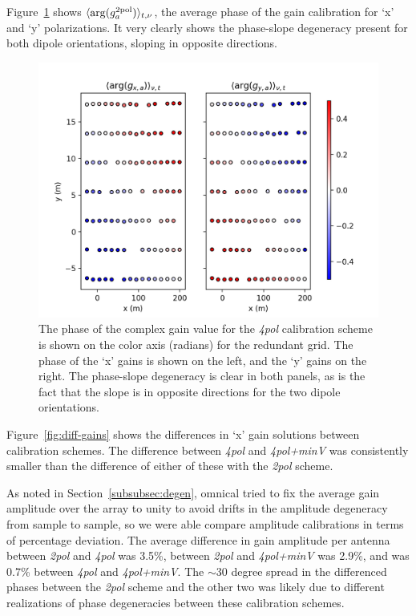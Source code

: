 Figure~\ref{fig:4pol-geo-angle} shows $\langle {\rm arg}( g^{\rm 2pol}_{a} ) \rangle_{t,\nu}$, the average phase of the gain calibration for `x' and `y' polarizations. It very clearly shows the phase-slope degeneracy present for both dipole orientations, sloping in opposite directions. 

\begin{figure}
\centering
\includegraphics[scale=0.5]{chapters/polcal/figures/4pol_geo.png}
\caption[The phase of the complex gain value for the \textit{4pol} calibration scheme.]{The phase of the complex gain value for the \textit{4pol} calibration scheme is shown on the color axis (radians) for the redundant grid. The phase of the `x' gains is shown on the left, and the `y' gains on the right. The phase-slope degeneracy is clear in both panels, as is the fact that the slope is in opposite directions for the two dipole orientations.}
\label{fig:4pol-geo-angle}
\end{figure}

Figure~\ref{fig:diff-gains} shows the differences in `x' gain solutions between calibration schemes. 
The difference between \textit{4pol} and \textit{4pol+minV} was consistently smaller than the difference of either of these with the \textit{2pol} scheme. 

As noted in Section~\ref{subsubsec:degen}, {\sc omnical} tried to fix the average gain amplitude over the array to unity to avoid drifts in the amplitude degeneracy from sample to sample, so we were able compare amplitude calibrations in terms of percentage deviation. The average difference in gain amplitude per antenna between \textit{2pol} and \textit{4pol} was 3.5\%, between \textit{2pol} and \textit{4pol+minV} was 2.9\%, and was 0.7\% between \textit{4pol} and \textit{4pol+minV}. The $\sim$30 degree spread in the differenced phases between the \textit{2pol} scheme and the other two was likely due to different realizations of phase degeneracies between these calibration schemes.

